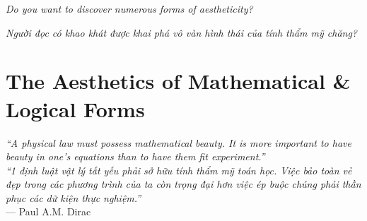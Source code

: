 \documentclass[11pt]{article}
\begin{document}
\textit{Do you want to discover numerous forms of aestheticity?}

\textit{Người đọc có khao khát được khai phá vô vàn hình thái của tính thẩm mỹ chăng?}


\part{The Aesthetics of Mathematical \& Logical Forms}

\vspace{0.5cm}
\begin{flushright}
    \begin{minipage}{0.65\textwidth}
        \textit{``A physical law must possess mathematical beauty. It is more important to have beauty in one's equations than to have them fit experiment.''} \\
        \textit{``1 định luật vật lý tất yếu phải sở hữu tính thẩm mỹ toán học. Việc bảo toàn vẻ đẹp trong các phương trình của ta còn trọng đại hơn việc ép buộc chúng phải thần phục các dữ kiện thực nghiệm.''} \\
        \vspace{1mm}
        \raggedleft \textsf{--- Paul A.M. Dirac}
    \end{minipage}
\end{flushright}
\vspace{1cm}
\end{document}
